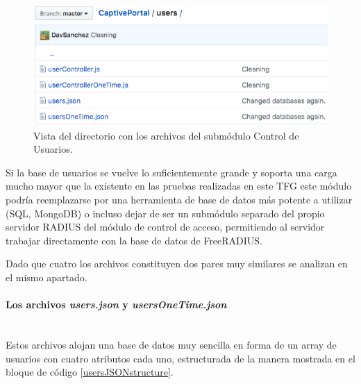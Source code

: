 \begin{figure}[!t]
\begin{center}
\includegraphics[width=0.75\linewidth]{./5_AnalisisOrganico/Img/usersDir.png}
\end{center}
\caption{Vista del directorio con los archivos del submódulo Control de Usuarios.}
\label{usersDir}
\end{figure}

Si la base de usuarios se vuelve lo suficientemente grande y soporta una carga mucho mayor que la existente en las pruebas realizadas en este TFG este módulo podría reemplazarse por una herramienta de base de datos más potente a utilizar (SQL, MongoDB) o incluso dejar de ser un submódulo separado del propio servidor RADIUS del módulo de control de acceso, permitiendo al servidor trabajar directamente con la base de datos de FreeRADIUS.

Dado que cuatro los archivos constituyen dos pares muy similares se analizan en el mismo apartado.

\paragraph{Los archivos \emph{users.json} y \emph{usersOneTime.json}} \label{usersJSONFiles} ~\\

Estos archivos alojan una base de datos muy sencilla en forma de un array de usuarios con cuatro atributos cada uno, estructurada de la manera mostrada en el bloque de código \ref{usersJSONstructure}.


